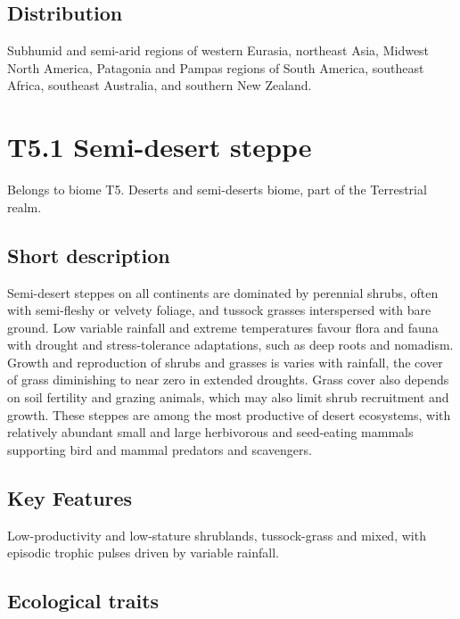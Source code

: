 \documentclass[
  letterpaper,
  DIV=11,
  numbers=noendperiod]{scrartcl}
\begin{document}
\subsection{Distribution}\label{distribution-87}

Subhumid and semi-arid regions of western Eurasia, northeast Asia,
Midwest North America, Patagonia and Pampas regions of South America,
southeast Africa, southeast Australia, and southern New Zealand.

\section{T5.1 Semi-desert steppe}\label{t5.1-semi-desert-steppe}

Belongs to biome T5. Deserts and semi-deserts biome, part of the
Terrestrial realm.

\subsection{Short description}\label{short-description-88}

Semi-desert steppes on all continents are dominated by perennial shrubs,
often with semi-fleshy or velvety foliage, and tussock grasses
interspersed with bare ground. Low variable rainfall and extreme
temperatures favour flora and fauna with drought and stress-tolerance
adaptations, such as deep roots and nomadism. Growth and reproduction of
shrubs and grasses is varies with rainfall, the cover of grass
diminishing to near zero in extended droughts. Grass cover also depends
on soil fertility and grazing animals, which may also limit shrub
recruitment and growth. These steppes are among the most productive of
desert ecosystems, with relatively abundant small and large herbivorous
and seed-eating mammals supporting bird and mammal predators and
scavengers.

\subsection{Key Features}\label{key-features-88}

Low-productivity and low-stature shrublands, tussock-grass and mixed,
with episodic trophic pulses driven by variable rainfall.

\subsection{Ecological traits}\label{ecological-traits-88}
\end{document}
